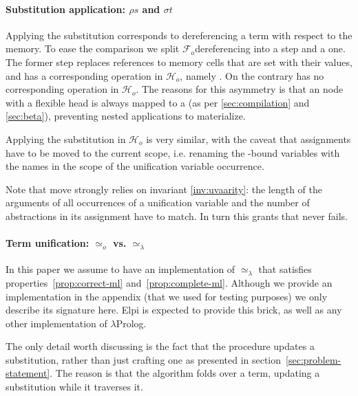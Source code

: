 \documentclass[sigconf,natbib=false,review]{acmart}
\newcommand{\UnifRel}{\ensuremath{\simeq}}
\newcommand{\Uo}{\ensuremath{\UnifRel_o}\xspace}
\newcommand{\Ue}{\ensuremath{\UnifRel_\lambda}\xspace}
\newcommand{\Fo}{\ensuremath{\mathcal{F}_{\!o}\xspace}} %
\newcommand{\Ho}{\ensuremath{\mathcal{H}_o}\xspace}
\begin{document}
\paragraph{Substitution application: $\rho s$ and $\sigma t$}

Applying the substitution corresponds to dereferencing a term with respect to
the memory. To ease the comparison we split \Fo dereferencing into a
 step and a  one. The former step replaces references
to memory cells that are set with their values, and has a corresponding
operation in \Ho, namely . On the contrary 
has no corresponding operation in \Ho. The reasons for this asymmetry is
that an  node with a flexible head is always mapped
to a  (as per \cref{sec:compilation} and \cref{sec:beta}),
preventing nested applications to materialize.



\noindent
Applying the substitution in \Ho{} is very similar, with
the caveat that assignments have to be moved to the
current scope, i.e. renaming the -bound variables
with the names in the scope of the unification variable occurrence.



\noindent
Note that move strongly relies on invariant \ref{inv:uvaarity}: the length
of the arguments of all occurrences of a unification variable and the
number of abstractions in its assignment have to match. In turn
this grants that  never fails.



\paragraph{Term unification: \Uo vs. \Ue}

In this paper we assume to have an implementation of \Ue that satisfies
properties~\ref{prop:correct-ml} and~\ref{prop:complete-ml}. Although we provide an
implementation in the appendix (that we used for testing purposes) we only
describe its signature here. Elpi is expected to provide this brick, as well as
any other implementation of $\lambda$Prolog.



\noindent
The only detail worth discussing is the fact that the procedure updates a
substitution, rather than just crafting one as presented in
section~\ref{sec:problem-statement}. The reason is that the algorithm folds
over a term, updating a substitution while it traverses it.
\end{document}

